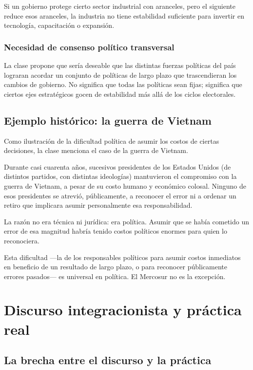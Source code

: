 \documentclass[12pt,oneside]{book}
\begin{document}
Si un gobierno protege cierto sector industrial con aranceles, pero el siguiente reduce esos aranceles, la industria no tiene estabilidad suficiente para invertir en tecnología, capacitación o expansión.

\subsection{Necesidad de consenso político transversal}

La clase propone que sería deseable que las distintas fuerzas políticas del país lograran acordar un conjunto de políticas de largo plazo que trascendieran los cambios de gobierno. No significa que todas las políticas sean fijas; significa que ciertos ejes estratégicos gocen de estabilidad más allá de los ciclos electorales.

\section{Ejemplo histórico: la guerra de Vietnam}

Como ilustración de la dificultad política de asumir los costos de ciertas decisiones, la clase menciona el caso de la guerra de Vietnam.

Durante casi cuarenta años, sucesivos presidentes de los Estados Unidos (de distintos partidos, con distintas ideologías) mantuvieron el compromiso con la guerra de Vietnam, a pesar de su costo humano y económico colosal. Ninguno de esos presidentes se atrevió, públicamente, a reconocer el error ni a ordenar un retiro que implicara asumir personalmente esa responsabilidad.

La razón no era técnica ni jurídica: era política. Asumir que se había cometido un error de esa magnitud habría tenido costos políticos enormes para quien lo reconociera.

Esta dificultad ---la de los responsables políticos para asumir costos inmediatos en beneficio de un resultado de largo plazo, o para reconocer públicamente errores pasados--- es universal en política. El Mercosur no es la excepción.

\chapter{Discurso integracionista y práctica real}

\section{La brecha entre el discurso y la práctica}
\end{document}
